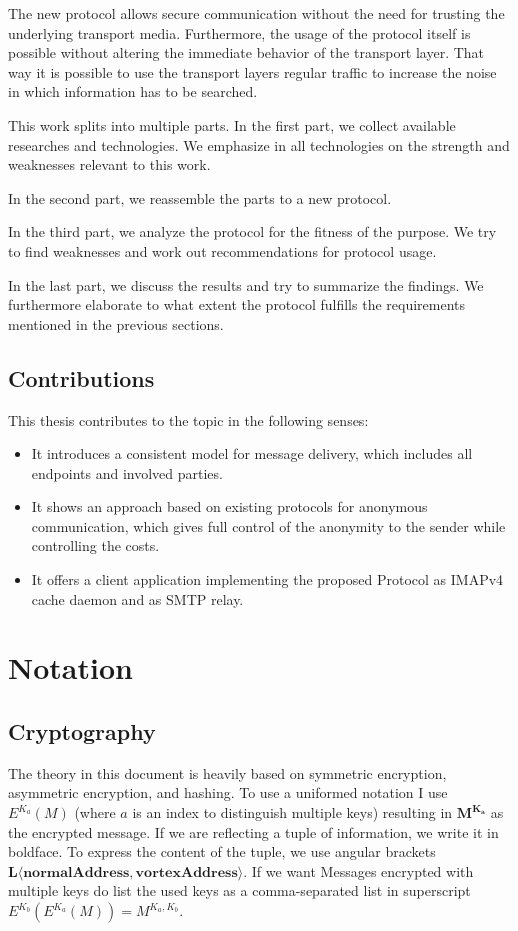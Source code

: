 The new protocol allows secure communication without the need for trusting the underlying transport media. Furthermore, the usage of the protocol itself is possible without altering the immediate behavior of the transport layer. That way it is possible to use the transport layers regular traffic to increase the noise in which information has to be searched. 

This work splits into multiple parts. In the first part, we collect available researches and technologies. We emphasize in all technologies on the strength and weaknesses relevant to this work. 

In the second part, we reassemble the parts to a new protocol. 

In the third part, we analyze the protocol for the fitness of the purpose. We try to find weaknesses and work out recommendations for protocol usage. 

In the last part, we discuss the results and try to summarize the findings. We furthermore elaborate to what extent the protocol fulfills the requirements mentioned in the previous sections.

\section{Contributions}
This thesis contributes to the topic in the following senses:
\begin{itemize}
	\item It introduces a consistent model for message delivery, which includes all endpoints and involved parties.
	\item It shows an approach based on existing protocols for anonymous communication, which gives full control of the anonymity to the sender while controlling the costs.
	\item It offers a client application implementing the proposed Protocol as IMAPv4 cache daemon and as SMTP relay.
\end{itemize}

\chapter{Notation}
\section{Cryptography \label{sec:encNot}}
The theory in this document is heavily based on symmetric encryption, asymmetric encryption, and hashing. To use a uniformed notation I use $E^{K_a}(M)$ (where $a$ is an index to distinguish multiple keys) resulting in $\mathbf{M^{K_a}}$ as the encrypted message. If we are reflecting a tuple of information, we write it in boldface. To express the content of the tuple, we use angular brackets $\mathbf{L\langle normalAddress,vortexAddress\rangle }$. If we want Messages encrypted with multiple keys do list the used keys as a comma-separated list in superscript $E^{K_b}\left(E^{K_a}\left(M\right)\right)=M^{{K_{a}},{K_b}}$.

